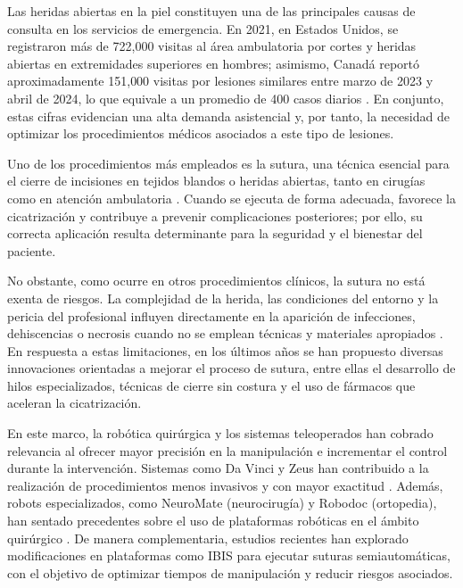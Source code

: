 
Las heridas abiertas en la piel constituyen una de las principales causas de
consulta en los servicios de emergencia. En 2021, en Estados Unidos, se
registraron más de 722{,}000 visitas al área ambulatoria por cortes y heridas
abiertas en extremidades superiores en hombres; asimismo, Canadá reportó
aproximadamente 151{,}000 visitas por lesiones similares entre marzo de 2023 y
abril de 2024, lo que equivale a un promedio de 400 casos diarios
\cite{Informe_emergencia_2021,CIHI}. En conjunto, estas cifras evidencian una
alta demanda asistencial y, por tanto, la necesidad de optimizar los
procedimientos médicos asociados a este tipo de lesiones.

Uno de los procedimientos más empleados es la sutura, una técnica esencial para
el cierre de incisiones en tejidos blandos o heridas abiertas, tanto en
cirugías como en atención ambulatoria \cite{Instru_quirurgica}. Cuando se
ejecuta de forma adecuada, favorece la cicatrización y contribuye a prevenir
complicaciones posteriores; por ello, su correcta aplicación resulta
determinante para la seguridad y el bienestar del paciente.

No obstante, como ocurre en otros procedimientos clínicos, la sutura no está
exenta de riesgos. La complejidad de la herida, las condiciones del entorno y
la pericia del profesional influyen directamente en la aparición de
infecciones, dehiscencias o necrosis cuando no se emplean técnicas y materiales
apropiados \cite{GONZALEZ-CELY2018}. En respuesta a estas limitaciones, en los
últimos años se han propuesto diversas innovaciones orientadas a mejorar el
proceso de sutura, entre ellas el desarrollo de hilos especializados, técnicas
de cierre sin costura y el uso de fármacos que aceleran la cicatrización.

En este marco, la robótica quirúrgica y los sistemas teleoperados han cobrado
relevancia al ofrecer mayor precisión en la manipulación e incrementar el
control durante la intervención. Sistemas como Da Vinci y Zeus han contribuido
a la realización de procedimientos menos invasivos y con mayor exactitud
\cite{DaVinci,DaVinci_tumor_2024}. Además, robots especializados, como
NeuroMate (neurocirugía) y Robodoc (ortopedia), han sentado precedentes sobre
el uso de plataformas robóticas en el ámbito quirúrgico
\cite{Historia_de_los_robots_cirujanos}. De manera complementaria, estudios
recientes han explorado modificaciones en plataformas como IBIS para ejecutar
suturas semiautomáticas, con el objetivo de optimizar tiempos de manipulación y
reducir riesgos asociados.

